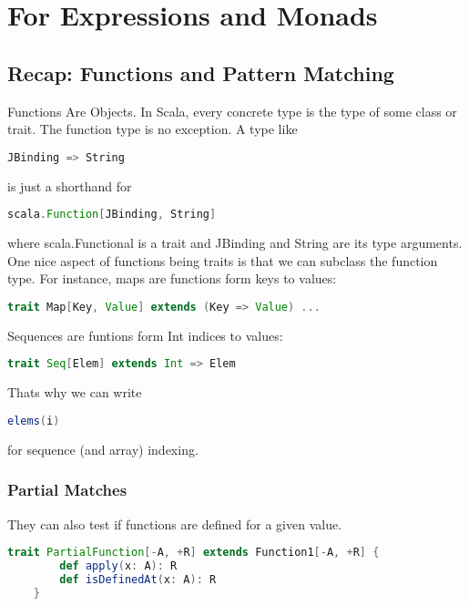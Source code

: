 \documentclass[10pt, a4paper]{report}
\begin{document}
\chapter{For Expressions and Monads}

\section{Recap: Functions and Pattern Matching}

Functions Are Objects. In Scala, every concrete type is the type of some class or trait. The function type is no exception. A type like 

\begin{lstlisting}[language=scala]
	JBinding => String
\end{lstlisting}

is just a shorthand for

\begin{lstlisting}[language=scala]
	scala.Function[JBinding, String]
\end{lstlisting}

where scala.Functional is a trait and JBinding and String are its type arguments. One nice aspect of functions being traits is that we can subclass the function type. For instance, maps are functions form keys to values:

\begin{lstlisting}[language=scala]
	trait Map[Key, Value] extends (Key => Value) ...
\end{lstlisting}

Sequences are funtions form Int indices to values:

\begin{lstlisting}[language=scala]
	trait Seq[Elem] extends Int => Elem
\end{lstlisting}

Thats why we can write
 
\begin{lstlisting}[language=scala]
	elems(i)
\end{lstlisting}

for sequence (and array) indexing.

\subsection{Partial Matches}
They can also test if functions are defined for a given value.

\begin{lstlisting}[language=scala]
	trait PartialFunction[-A, +R] extends Function1[-A, +R] {
		def apply(x: A): R
		def isDefinedAt(x: A): R
	}
\end{lstlisting}
\end{document}

